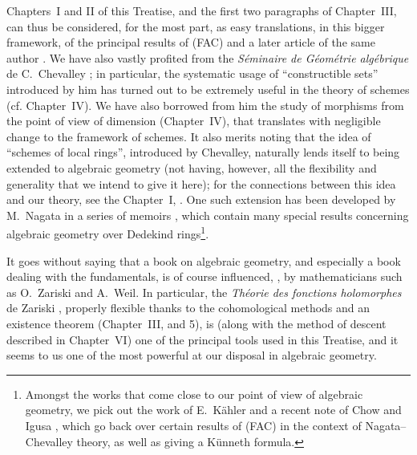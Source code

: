\documentclass[10pt,oneside]{book}
\begin{document}
Chapters~I and II of this Treatise, and the first two paragraphs of Chapter~III,
can thus be considered, for the most part, as easy translations, in this bigger
framework, of the principal results of (FAC) and a later article of the same
author \cite{15}. We have also vastly profited from the \emph{S\'eminaire de
G\'eom\'etrie alg\'ebrique} de C.~Chevalley \cite{1}; in particular, the
systematic usage of ``constructible sets'' introduced by him has turned out to
be extremely useful in the theory of schemes (cf. Chapter~IV). We have also
borrowed from him the study of morphisms from
the point of view of dimension (Chapter~IV), that translates with negligible change to the
framework of schemes. It also merits noting that the idea of ``schemes of local rings'',
introduced by Chevalley, naturally lends itself to being extended to algebraic
geometry (not having, however, all the flexibility and generality that we intend
to give it here); for the connections between this idea and our theory, see the
Chapter~I, . One such extension has been developed by M.~Nagata in
a series of memoirs \cite{9}, which contain many special results concerning
algebraic geometry over Dedekind rings\footnote{Amongst the works that come
close to our point of view of algebraic geometry, we pick out the work of
E.~K\"ahler \cite{22} and a recent note of Chow and Igusa \cite{3}, which go
back over certain results of (FAC) in the context of Nagata--Chevalley theory, as
well as giving a K\"unneth formula.}.

\asttri

It goes without saying that a book on algebraic geometry, and especially a book
dealing with the fundamentals, is of course influenced, \completelyunsure, by
mathematicians such as O.~Zariski and A.~Weil. In particular, the
\emph{Th\'eorie des fonctions holomorphes} de Zariski \cite{20}, properly
flexible thanks to the cohomological methods and an existence theorem
(Chapter~III, \textsection{} and 5), is (along with the method of
descent described in Chapter~VI) one of the principal tools used in this Treatise,
and it seems to us one of the most powerful at our disposal in algebraic
geometry.
\end{document}

